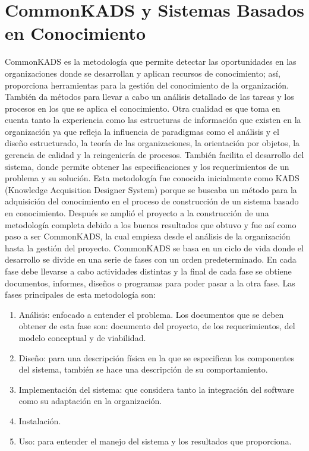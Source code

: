 \section{CommonKADS y Sistemas Basados en Conocimiento}


CommonKADS es la metodología que permite detectar las oportunidades en las organizaciones donde se desarrollan y aplican recursos de conocimiento; así, proporciona herramientas para la gestión del conocimiento de la organización. También da métodos para llevar a cabo un análisis detallado de las tareas y los procesos en los que se aplica el conocimiento. Otra cualidad es que toma en cuenta tanto la experiencia como las estructuras de información que existen en la organización ya que refleja la influencia de paradigmas como el análisis y el diseño estructurado, la teoría de las organizaciones, la orientación por objetos, la gerencia de calidad y la reingeniería de procesos. También facilita el desarrollo del sistema, donde permite obtener las especificaciones y los requerimientos de un problema y su solución.
Esta metodología fue conocida inicialmente como KADS (Knowledge Acquisition Designer System) porque se buscaba un método para la adquisición del conocimiento en el proceso de construcción de un sistema basado en conocimiento. Después se amplió el proyecto a la construcción de una metodología completa debido a los buenos resultados que obtuvo y fue así como paso a ser CommonKADS, la cual empieza desde el análisis de la organización hasta la gestión del proyecto.
CommonKADS se basa en un ciclo de vida donde el desarrollo se divide en una serie de fases con un orden predeterminado. En cada fase debe llevarse a cabo actividades distintas y la final de cada fase se obtiene documentos, informes, diseños o programas para poder pasar a la otra fase. Las fases principales de esta metodología son:

\begin{enumerate}
\item Análisis: enfocado a entender el problema. Los documentos que se deben obtener de esta fase son: documento del proyecto, de los requerimientos, del modelo conceptual y de viabilidad.
\item Diseño: para una descripción física en la que se especifican los componentes del sistema, también se hace una descripción de su comportamiento.
\item Implementación del sistema: que considera tanto la integración del software como su adaptación en la organización.
\item Instalación.
\item Uso: para entender el manejo del sistema y los resultados que proporciona.
\end{enumerate}

